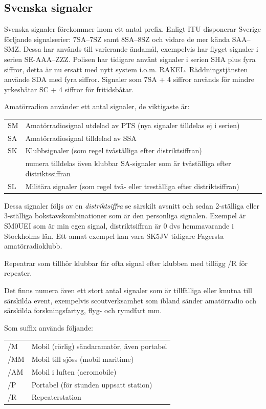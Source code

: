 \subsection{Svenska signaler}

Svenska signaler förekommer inom ett antal prefix. Enligt ITU disponerar Sverige förljande signalserier: 7SA--7SZ samt 8SA--8SZ och vidare de mer kända SAA--SMZ. Dessa har används till varierande ändamål, exempelvis har flyget signaler i serien SE-AAA--ZZZ. Polisen har tidigare använt signaler i serien SHA plus fyra siffror, detta är nu ersatt med nytt system i.o.m. RAKEL. Räddningstjänsten använde SDA med fyra siffror. Signaler som 7SA + 4 siffror används för mindre yrkesbåtar SC + 4 siffror för fritidsbåtar.

Amatörradion använder ett antal signaler, de viktigaste är:

\begin{tabular}{ll}
	SM & Amatörradiosignal utdelad av PTS (nya signaler tilldelas ej i serien)               \\
	SA & Amatörradiosignal tilldelad av SSA                                                  \\
	SK & Klubbsignaler (som regel tvåställiga efter distriktsiffran)                         \\
	   & numera tilldelas även klubbar SA-signaler som är tvåställiga efter distriktssiffran \\
	SL & Militära signaler (som regel två- eller treställiga efter distriktsiffran)
\end{tabular}

Dessa signaler följs av en \textit{distriktsiffra} se särskilt avsnitt och sedan 2-ställiga eller 3-ställiga bokstavskombinationer som är den personliga signalen. Exempel är SM0UEI som är min egen signal, distriktsiffran är 0 dvs hemmavarande i Stockholms län. Ett annat exempel kan vara SK5JV tidigare Fagersta amatörradioklubb.

Repeatrar som tillhör klubbar får ofta signal efter klubben med tillägg /R för repeater.

Det finns numera även ett stort antal signaler som är tillfälliga eller knutna till särskilda event, exempelvis scoutverksamhet som ibland sänder amatörradio och särskilda forskningsfartyg, flyg- och rymdfart mm.

Som suffix används följande:

\begin{tabular}{ll}
	/M  & Mobil (rörlig) sändaramatör, även portabel \\
	/MM & Mobil till sjöss (mobil maritime)          \\
	/AM & Mobil i luften (aeromobile)                \\
	/P  & Portabel (för stunden uppsatt station)     \\
	/R  & Repeaterstation
\end{tabular}

